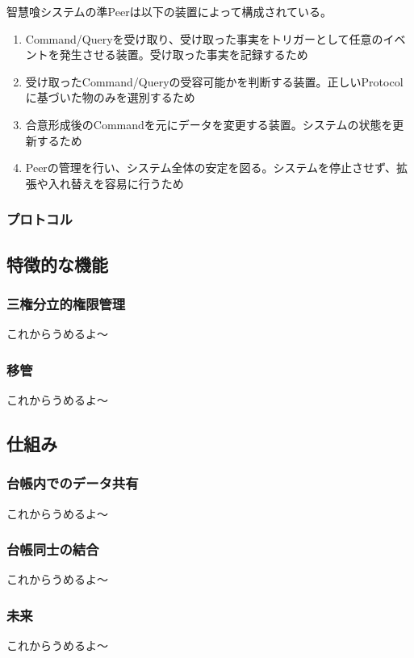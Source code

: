 \documentclass[10pt,a4paper]{jarticle}
\begin{document}
\begin{multicols}{2}
智慧喰システムの準Peerは以下の装置によって構成されている。
\begin{enumerate}
  \item Command/Queryを受け取り、受け取った事実をトリガーとして任意のイベントを発生させる装置。受け取った事実を記録するため
  \item 受け取ったCommand/Queryの受容可能かを判断する装置。正しいProtocolに基づいた物のみを選別するため
  \item 合意形成後のCommandを元にデータを変更する装置。システムの状態を更新するため
  \item Peerの管理を行い、システム全体の安定を図る。システムを停止させず、拡張や入れ替えを容易に行うため  
\end{enumerate}

\subsubsection{プロトコル}


\subsection{特徴的な機能}

\subsubsection{三権分立的権限管理}
これからうめるよ〜

\subsubsection{移管}
これからうめるよ〜

\subsection{仕組み}

\subsubsection{台帳内でのデータ共有}
これからうめるよ〜

\subsubsection{台帳同士の結合}
これからうめるよ〜

\subsubsection{未来}
これからうめるよ〜

\end{multicols}
\end{document}
